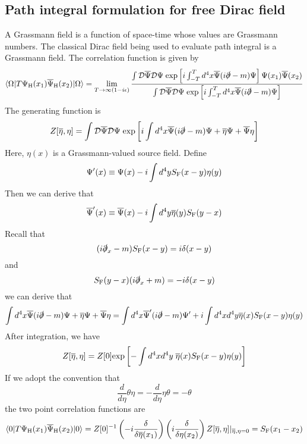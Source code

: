 \subsection{Path integral formulation for free Dirac field}
A Grassmann field is a function of space-time whose values are Grassmann numbers. The classical Dirac field being used to evaluate path integral is a Grassmann field. The correlation function is given by
\[\langle \Omega | T \Psi_{\rm H}(x_1) \overline{\Psi}_{\rm H}(x_2)| \Omega \rangle = \lim_{T \to \infty(1-i\epsilon)} \frac{\int \mathcal{D}\overline{\Psi} \mathcal{D}\Psi \; \mathrm{exp} \left[ i\int_{-T}^T d^4x \overline{\Psi}(i\slashed{\partial}-m)\Psi \right] \Psi(x_1) \overline{\Psi}(x_2)}{\int \mathcal{D}\overline{\Psi} \mathcal{D}\Psi \; \mathrm{exp} \left[ i\int_{-T}^T d^4x \overline{\Psi}(i\slashed{\partial}-m)\Psi \right]}\]
The generating function is 
\[Z[\overline{\eta},\eta] = \int \mathcal{D}\overline{\Psi} \mathcal{D}\Psi \; \mathrm{exp} \left[ i\int d^4x \overline{\Psi}(i\slashed{\partial}-m)\Psi + \overline{\eta}\Psi + \overline{\Psi}\eta \right]\]
Here, $\eta(x)$ is a Grassmann-valued source field. 
Define
\[\Psi'(x) \equiv \Psi(x) - i \int d^4y S_{\rm F}(x-y)\eta(y)\]
Then we can derive that
\[\overline{\Psi}'(x) \equiv \overline{\Psi}(x) - i \int d^4y \overline{\eta}(y)S_{\rm F}(y-x)\]
Recall that
\[(i\slashed{\partial}_x-m)S_{\rm F}(x-y) = i\delta(x-y)\]
and
\[S_{\rm F}(y-x)(i \slashed{\partial}_x+m) = -i\delta(x-y)\]
we can derive that
\[\int d^4x \overline{\Psi}(i\slashed{\partial}-m)\Psi + \overline{\eta}\Psi + \overline{\Psi}\eta = \int d^4x \overline{\Psi}'(i\slashed{\partial}-m)\Psi' + i \int d^4x d^4y \overline{\eta}(x)S_{\rm F}(x-y)\eta(y) \]
After integration, we have
\[Z[\overline{\eta},\eta] = Z[0] \mathrm{exp} \left[ -\int d^4x d^4y \; \overline{\eta}(x)S_{\rm F}(x-y)\eta(y) \right]\]
If we adopt the convention that
\[\frac{d}{d\eta} \theta \eta = - \frac{d}{d\eta} \eta \theta = - \theta\]
the two point correlation functions are
\[\langle 0 | T \Psi_{\rm H}(x_1) \overline{\Psi}_{\rm H}(x_2)| 0 \rangle = Z[0]^{-1} \left(-i \frac{\delta}{\delta \overline{\eta}(x_1)} \right) \left(i \frac{\delta}{\delta \eta(x_2)} \right) Z[\overline{\eta},\eta]|_{\overline{\eta},\eta=0} = S_{\rm F}(x_1-x_2) \]


